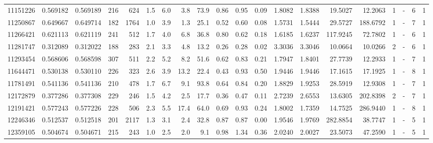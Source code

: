 \begin{center}
\begin{tabular}{rccrrccrrrrrrrrrrlrr}
  11151226 & 0.569182 & 0.569189 &  216 &  624 &      1.5 &      6.0 &     3.8 &    73.9 &   0.86 &   0.95 &       0.09 &  1.8082 &  1.8388 &   19.5027 &   12.2063 &       1 &             - &        6 &         1 \\
  11250867 & 0.649667 & 0.649714 &  182 & 1764 &      1.0 &      3.9 &     1.3 &    25.1 &   0.52 &   0.60 &       0.08 &  1.5731 &  1.5444 &   29.5727 &  188.6792 &       1 &             - &        7 &         1 \\
  11266421 & 0.621113 & 0.621119 &  241 &  512 &      1.7 &      4.0 &     6.8 &    36.8 &   0.80 &   0.62 &       0.18 &  1.6185 &  1.6237 &  117.9245 &   72.7802 &       1 &             - &        6 &         1 \\
  11281747 & 0.312089 & 0.312022 &  188 &  283 &      2.1 &      3.3 &     4.8 &    13.2 &   0.26 &   0.28 &       0.02 &  3.3036 &  3.3046 &   10.0664 &   10.0266 &       2 &             - &        6 &         1 \\
  11293454 & 0.568606 & 0.568598 &  307 &  511 &      2.2 &      5.2 &     8.2 &    51.6 &   0.62 &   0.83 &       0.21 &  1.7947 &  1.8401 &   27.7739 &   12.2933 &       1 &             - &        7 &         1 \\
  11644471 & 0.530138 & 0.530110 &  226 &  323 &      2.6 &      3.9 &    13.2 &    22.4 &   0.43 &   0.93 &       0.50 &  1.9446 &  1.9446 &   17.1615 &   17.1925 &       1 &             - &        8 &         1 \\
  11781491 & 0.541136 & 0.541136 &  210 &  478 &      1.7 &      6.7 &     9.1 &    93.8 &   0.64 &   0.84 &       0.20 &  1.8829 &  1.9253 &   28.5919 &   12.9308 &       1 &             - &        7 &         1 \\
  12172879 & 0.377286 & 0.377308 &  229 &  246 &      1.5 &      4.2 &     2.5 &    17.7 &   0.36 &   0.47 &       0.11 &  2.7239 &  2.6553 &   13.6305 &  202.8398 &       2 &             - &        7 &         1 \\
  12191421 & 0.577243 & 0.577226 &  228 &  506 &      2.3 &      5.5 &    17.4 &    64.0 &   0.69 &   0.93 &       0.24 &  1.8002 &  1.7359 &   14.7525 &  286.9440 &       1 &             - &        8 &         1 \\
  12246346 & 0.512537 & 0.512518 &  201 & 2117 &      1.3 &      3.1 &     2.4 &    32.8 &   0.87 &   0.87 &       0.00 &  1.9546 &  1.9769 &  282.8854 &   38.7747 &       1 &             - &        5 &         1 \\
  12359105 & 0.504674 & 0.504671 &  215 &  243 &      1.0 &      2.5 &     2.0 &     9.1 &   0.98 &   1.34 &       0.36 &  2.0240 &  2.0027 &   23.5073 &   47.2590 &       1 &             - &        5 &         1 \\

\end{tabular}
\end{center}
